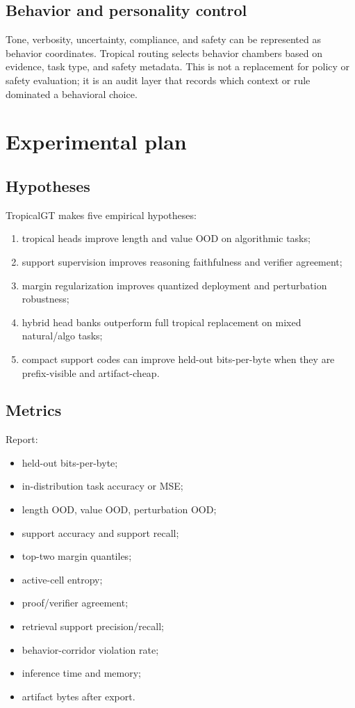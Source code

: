 \documentclass[11pt]{article}
\begin{document}
\subsection{Behavior and personality control}

Tone, verbosity, uncertainty, compliance, and safety can be represented as behavior coordinates.  Tropical routing selects behavior chambers based on evidence, task type, and safety metadata.  This is not a replacement for policy or safety evaluation; it is an audit layer that records which context or rule dominated a behavioral choice.

\section{Experimental plan}

\subsection{Hypotheses}

TropicalGT makes five empirical hypotheses:
\begin{enumerate}
\item tropical heads improve length and value OOD on algorithmic tasks;
\item support supervision improves reasoning faithfulness and verifier agreement;
\item margin regularization improves quantized deployment and perturbation robustness;
\item hybrid head banks outperform full tropical replacement on mixed natural/algo tasks;
\item compact support codes can improve held-out bits-per-byte when they are prefix-visible and artifact-cheap.
\end{enumerate}

\subsection{Metrics}

Report:
\begin{itemize}
\item held-out bits-per-byte;
\item in-distribution task accuracy or MSE;
\item length OOD, value OOD, perturbation OOD;
\item support accuracy and support recall;
\item top-two margin quantiles;
\item active-cell entropy;
\item proof/verifier agreement;
\item retrieval support precision/recall;
\item behavior-corridor violation rate;
\item inference time and memory;
\item artifact bytes after export.
\end{itemize}
\end{document}
